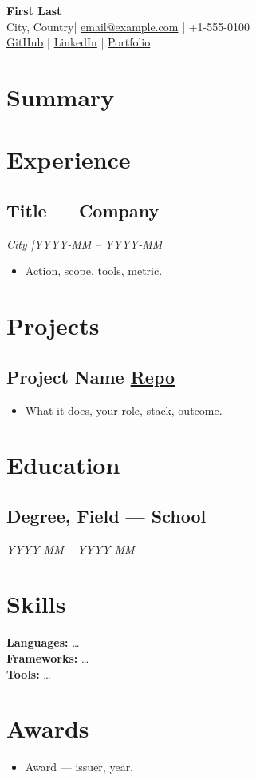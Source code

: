 \documentclass[10pt,letterpaper]{article}
\makeatletter
\newcommand{\Name}{First Last}
\newcommand{\Email}{email@example.com}
\newcommand{\Phone}{+1-555-0100}
\newcommand{\Location}{City, Country}
\newcommand{\LinkedIn}{https://linkedin.com/in/username}
\newcommand{\GitHub}{https://github.com/username}
\newcommand{\Portfolio}{https://example.com}
\makeatother
\begin{document}
\begin{center}
  {\LARGE\bfseries \Name}\\[0.35em]
  \Location \quad|\quad
  \href{mailto:\Email}{\Email} \quad|\quad
  \Phone\\[0.2em]
  \href{\GitHub}{GitHub} \quad|\quad
  \href{\LinkedIn}{LinkedIn} \quad|\quad
  \href{\Portfolio}{Portfolio}
\end{center}

\section{Summary}

\section{Experience}
\subsection{Title --- Company}
\textit{City \quad|\quad YYYY-MM -- YYYY-MM}
\begin{itemize}
  \item Action, scope, tools, metric.
\end{itemize}

\section{Projects}
\subsection{Project Name \quad \href{https://github.com/org/repo}{Repo}}
\begin{itemize}
  \item What it does, your role, stack, outcome.
\end{itemize}

\section{Education}
\subsection{Degree, Field --- School}
\textit{YYYY-MM -- YYYY-MM}

\section{Skills}
\textbf{Languages:} \ldots\\
\textbf{Frameworks:} \ldots\\
\textbf{Tools:} \ldots

\section{Awards}
\begin{itemize}
  \item Award --- issuer, year.
\end{itemize}
\end{document}
